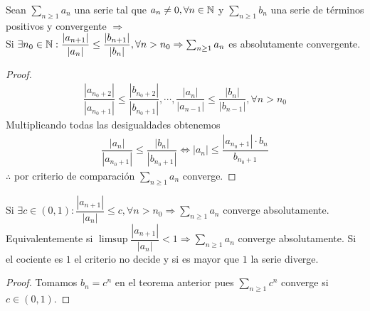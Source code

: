 \begin{theorem}
  Sean $\sum_{n \geq 1} a_n$ una serie tal que $a_n \neq 0, \forall n \in \mathbb{N}$ y $\sum_{n \geq 1} b_n$ una serie de términos positivos y convergente $\Rightarrow$ \\
  Si $\exists n_0 \in \mathbb{N} : \dfrac{|a_{n+1}|}{|a_n|} \leq \dfrac{|b_{n+1}|}{|b_n|}, \forall n > n_0 \Rightarrow \sum_{n \geq 1} a_n$ es absolutamente convergente.

  \begin{proof}
    \begin{align*}
      \dfrac{|a_{n_0 + 2}|}{|a_{n_0 + 1}|} \leq \dfrac{|b_{n_0+2}|}{|b_{n_0+1}|}, \cdots, \dfrac{|a_n|}{|a_{n-1}|} \leq \dfrac{|b_n|}{|b_{n-1}|}, \forall n > n_0
    \end{align*}
    Multiplicando todas las desigualdades obtenemos
    \begin{align*}
      \dfrac{|a_n|}{|a_{n_0+1}|} \leq \dfrac{|b_n|}{|b_{n_0+1}|} \iff |a_n| \leq \dfrac{|a_{n_0+1}| \cdot b_n}{b_{n_0+1}}
    \end{align*}
    $\therefore$ por criterio de comparación $\sum_{n \geq 1} a_n$ converge.
  \end{proof}
\end{theorem}

\begin{corollary}
  Si $\exists c \in (0, 1) : \dfrac{|a_{n+1}|}{|a_n|} \leq c, \forall n > n_0 \Rightarrow \sum_{n \geq 1} a_n$ converge absolutamente. \\
  Equivalentemente si $\limsup \dfrac{|a_{n+1}|}{|a_n|} < 1 \Rightarrow \sum_{n \geq 1} a_n$ converge absolutamente.
  Si el cociente es $1$ el criterio no decide y si es mayor que $1$ la serie diverge.
  \begin{proof}
    Tomamos $b_n = c^n$ en el teorema anterior pues $\sum_{n \geq 1} c^n$ converge si $c \in (0 ,1)$.
  \end{proof}
\end{corollary}

